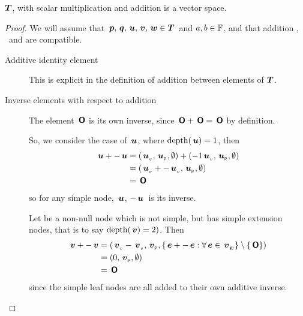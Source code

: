 \begin{proposition}\label{vspace} $\boldsymbol{T}$, with scalar multiplication and addition is a vector space.
  \begin{proof}
    We will assume that  \(\,\boldsymbol{p}, \,\boldsymbol{q}, \,\boldsymbol{u},\,\boldsymbol{v},\,\boldsymbol{w} \in \boldsymbol{T}\)\ and \(a, b \in  \mathbb{F}\), and that
    addition , \ and  are compatible.

    \vspace{28pt}
    \begin{description} 
    \item[Additive identity element]

      This is explicit in the definition of addition between elements
      of $\boldsymbol{T}$.

    \item[Inverse elements with respect to addition]

      The element \(\,\boldsymbol{\mathsf{O}}\) is its own inverse, since \(\,\boldsymbol{\mathsf{O}}
      + \,\boldsymbol{\mathsf{O}} = \,\boldsymbol{\mathsf{O}}\) by definition.

      So, we consider the case of $\,\boldsymbol{u}$, where \(\operatorname{depth}(\,\boldsymbol{u})
      = 1\), then
      \begin{align*}
          \,\boldsymbol{u} + -\,\boldsymbol{u} &=  ({{\,\boldsymbol{u}}_{{}_{v}}}, {{\,\boldsymbol{u}}_{{}_{\mathsf{P}}}}, {\emptyset}) + ({-1{\,\boldsymbol{u}}_{{}_{v}}}, {{\,\boldsymbol{u}}_{{}_{\mathsf{P}}}}, {\emptyset}) \\
          &= ({\,\boldsymbol{u}}_{{}_{v}} + -{\,\boldsymbol{u}}_{{}_{v}}, {\,\boldsymbol{u}}_{{}_{\mathsf{P}}}, \emptyset) \\
          &= \,\boldsymbol{\mathsf{O}}
      \end{align*}
      so for any simple node, \(\,\boldsymbol{u}\), \(-\,\boldsymbol{u}\)\ is its
      inverse.

      Let  be a non-null node which is not simple, but has
      simple extension  nodes, that is to say \(\operatorname{depth}(\,\boldsymbol{v}) = 2)\).  Then 
      \begin{align*}
          \,\boldsymbol{v} + -\,\boldsymbol{v} &= ({\,\boldsymbol{v}}_{{}_{v}} - {\,\boldsymbol{v}}_{{}_{v}}, {\,\boldsymbol{v}}_{{}_{\mathsf{P}}}, \lbrace \,\boldsymbol{e} + -\,\boldsymbol{e}: \forall \,\boldsymbol{e} \in {\,\boldsymbol{v}}_{{}_{\boldsymbol{E}}}\rbrace \setminus\{\,\boldsymbol{\mathsf{O}}\}) \\
          &= (0, {\,\boldsymbol{v}}_{{}_{\mathsf{P}}}, \emptyset) \\
          &= \,\boldsymbol{\mathsf{O}}
      \end{align*}
      since the simple leaf nodes are all added to their own additive
      inverse.


\end{description}
\end{proof}
\end{proposition}

